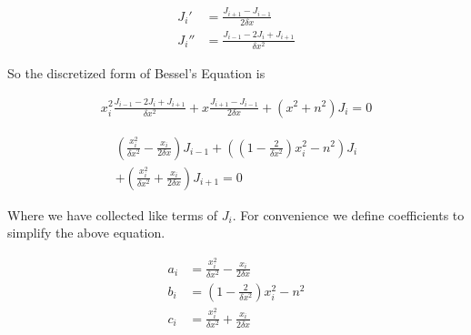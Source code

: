 \documentclass[twocolumn, groupedaddress]{revtex4-1}
\begin{document}
\begin{align}
J_i'  &= \frac{J_{i+1} - J_{i-1}}{2 \delta x} \\
J_i'' &= \frac{J_{i-1} - 2J_{i} + J_{i+1}}{\delta x^2}
\end{align}

So the discretized form of Bessel's Equation is

\begin{align}
\label{eqn:Bessel's Equation Discretized}
x_i^2 \frac{J_{i-1} - 2J_{i} + J_{i+1}}{\delta x^2} + x \frac{J_{i+1} - J_{i-1}}{2 \delta x} + (x^2 + n^2) J_i = 0
\end{align}

\begin{align}
\left(\frac{x_i^2}{\delta x^2} - \frac{x_i}{2\delta x}\right) J_{i-1}			\nonumber
	+ \left( \left(1-\frac{2}{\delta x^2}\right)x_i^2 - n^2 \right) J_i		\\
	+ \left(\frac{x_i^2}{\delta x^2} + \frac{x_i}{2\delta x}\right) J_{i+1}
	= 0
\end{align}

Where we have collected like terms of $J_i$.  For convenience we define coefficients to simplify the above equation.

\begin{align}
a_i &= \frac{x_i^2}{\delta x^2} - \frac{x_i}{2\delta x} 	\\
b_i &= \left(1-\frac{2}{\delta x^2}\right)x_i^2 - n^2  	\\
c_i &= \frac{x_i^2}{\delta x^2} + \frac{x_i}{2\delta x}
\end{align}



\appendix
\onecolumngrid
\end{document}
